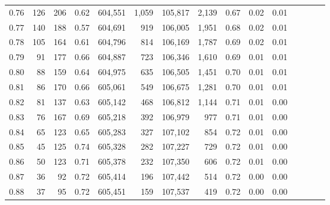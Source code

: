 \begin{tabular}{rrrcrrrrrrrrrrr}
0.76 &     126 &    206 &                                       0.62 &  604,551 &    1,059 &  105,817 &    2,139 &  0.67 &  0.02 &                         0.01 \\
0.77 &     140 &    188 &                                       0.57 &  604,691 &      919 &  106,005 &    1,951 &  0.68 &  0.02 &                         0.01 \\
0.78 &     105 &    164 &                                       0.61 &  604,796 &      814 &  106,169 &    1,787 &  0.69 &  0.02 &                         0.01 \\
0.79 &      91 &    177 &                                       0.66 &  604,887 &      723 &  106,346 &    1,610 &  0.69 &  0.01 &                         0.01 \\
0.80 &      88 &    159 &                                       0.64 &  604,975 &      635 &  106,505 &    1,451 &  0.70 &  0.01 &                         0.01 \\
0.81 &      86 &    170 &                                       0.66 &  605,061 &      549 &  106,675 &    1,281 &  0.70 &  0.01 &                         0.01 \\
0.82 &      81 &    137 &                                       0.63 &  605,142 &      468 &  106,812 &    1,144 &  0.71 &  0.01 &                         0.00 \\
0.83 &      76 &    167 &                                       0.69 &  605,218 &      392 &  106,979 &      977 &  0.71 &  0.01 &                         0.00 \\
0.84 &      65 &    123 &                                       0.65 &  605,283 &      327 &  107,102 &      854 &  0.72 &  0.01 &                         0.00 \\
0.85 &      45 &    125 &                                       0.74 &  605,328 &      282 &  107,227 &      729 &  0.72 &  0.01 &                         0.00 \\
0.86 &      50 &    123 &                                       0.71 &  605,378 &      232 &  107,350 &      606 &  0.72 &  0.01 &                         0.00 \\
0.87 &      36 &     92 &                                       0.72 &  605,414 &      196 &  107,442 &      514 &  0.72 &  0.00 &                         0.00 \\
0.88 &      37 &     95 &                                       0.72 &  605,451 &      159 &  107,537 &      419 &  0.72 &  0.00 &                         0.00 \\

\end{tabular}
